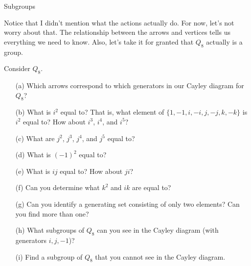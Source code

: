 \begin{section}{Subgroups}
\begin{center}
\end{center}

Notice that I didn't mention what the actions actually do.  For now, let's not worry about that.  The relationship between the arrows and vertices tells us everything we need to know.  Also, let's take it for granted that $Q_8$ actually is a group.

\begin{exercise}
Consider $Q_8$.
\begin{enumerate}
\item[(a)] Which arrows correspond to which generators in our Cayley diagram for $Q_8$?
\item[(b)] What is $i^2$ equal to?  That is, what element of $\{1,-1,i,-i,j,-j,k,-k\}$ is $i^2$ equal to?  How about $i^3$, $i^4$, and $i^5$?
\item[(c)] What are $j^2$, $j^3$, $j^4$, and $j^5$ equal to?
\item[(d)] What is $(-1)^2$ equal to?
\item[(e)] What is $ij$ equal to?  How about $ji$?
\item[(f)] Can you determine what $k^2$ and $ik$ are equal to?
\item[(g)] Can you identify a generating set consisting of only two elements?  Can you find more than one?
\item[(h)] What subgroups of $Q_8$ can you see in the Cayley diagram (with generators $i, j, -1$)?
\item[(i)] Find a subgroup of $Q_8$ that you cannot see in the Cayley diagram.
\end{enumerate}
\end{exercise}

\end{section}

